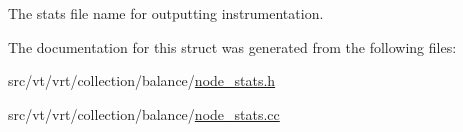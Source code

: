 The stats file name for outputting instrumentation. 



The documentation for this struct was generated from the following files\+:\begin{DoxyCompactItemize}
\item 
src/vt/vrt/collection/balance/\hyperlink{node__stats_8h}{node\+\_\+stats.\+h}\item 
src/vt/vrt/collection/balance/\hyperlink{node__stats_8cc}{node\+\_\+stats.\+cc}\end{DoxyCompactItemize}
